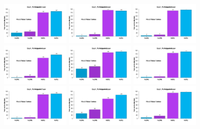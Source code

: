 \documentclass[a4paper ]{article}
\begin{document}
\begin{figure}[th]
\centering
\includegraphics[width=0.3\textwidth]{Figures/MirrorRate_Exp1_P1} \includegraphics[width=0.3\textwidth]{Figures/MirrorRate_Exp1_P2} \includegraphics[width=0.3\textwidth]{Figures/MirrorRate_Exp1_P3}
\includegraphics[width=0.3\textwidth]{Figures/MirrorRate_Exp1_P4} \includegraphics[width=0.3\textwidth]{Figures/MirrorRate_Exp1_P5} \includegraphics[width=0.3\textwidth]{Figures/MirrorRate_Exp1_P6}
\includegraphics[width=0.3\textwidth]{Figures/MirrorRate_Exp1_P7} \includegraphics[width=0.3\textwidth]{Figures/MirrorRate_Exp1_P8} \includegraphics[width=0.3\textwidth]{Figures/MirrorRate_Exp1_P9}

\end{figure}
\end{document}
